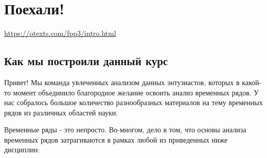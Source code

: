 \chapter{Поехали!}
\url{https://otexts.com/fpp3/intro.html}

\section{Как мы построили данный курс}

Привет! Мы команда увлеченных анализом данных энтузиастов, которых в
какой-то момент объединило благородное желание освоить анализ
временных рядов. У нас собралось большое количество
разнообразных материалов на
тему временных рядов из различных областей науки.

Временные ряды - это непросто. Во-многом, дело в том, что основы
анализа временных рядов затрагиваются
в рамках любой из приведенных ниже дисциплин:
